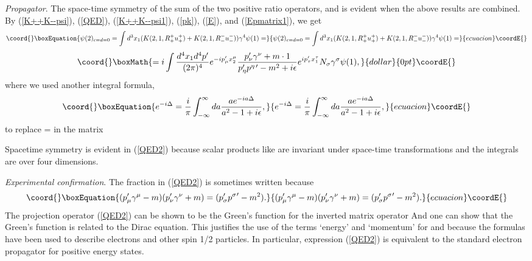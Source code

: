 \documentclass[a4paper,12pt]{article}
\begin{document}
	\coordHE{} {\textit{Propagator}}. The space-time symmetry of the sum of the two positive ratio operators, \coordHE{} and \coordHE{} is evident when the above results are combined. By (\ref{K++K--psi}), (\ref{QED}), (\ref{K++K--psi1}), (\ref{pk}), (\ref{E}), and (\ref{Epmatrix1}), we get
\begin{equation}\coord{}\boxEquation{	\label{QED2}
\psi(2)_{c=d=0} = \int d^3x_{1}(K(2,1,R_{+}^{+}u_{+}^{+}) + K(2,1,R_{-}^{-}u_{-}^{-})) \gamma^{4} \psi(1) =
}{	\psi(2)_{c=d=0} = \int d^3x_{1}(K(2,1,R_{+}^{+}u_{+}^{+}) + K(2,1,R_{-}^{-}u_{-}^{-})) \gamma^{4} \psi(1) =
}{ecuacion}\coordE{}\end{equation}
$$\coord{}\boxMath{ = i\int \frac{d^4 x_{1} d^4 p^{\prime} }{(2 \pi)^4} e^{-ip_{\mu}^{\prime}x_{2}^{\mu}}  \frac{ p_{\nu}^{\prime} \gamma^{\nu} + m \cdot 1}{p_{\eta}^{\prime}p^{\eta \, \prime}  - m^2 + i\epsilon} e^{ i p_{\tau}^{\prime} x_{1}^{\tau}} N_{\sigma} \gamma^{\sigma} \psi(1),}{dollar}{0pt}\coordE{}$$
where we used another integral formula,
\begin{equation}\coord{}\boxEquation{ \label{expiDelta2}	
e^{-i \Delta} =  \frac{i}{ \pi} \int_{-\infty}^{\infty} da \frac{ae^{-ia\Delta}}{a^2-1+i\epsilon},
}{ e^{-i \Delta} =  \frac{i}{ \pi} \int_{-\infty}^{\infty} da \frac{ae^{-ia\Delta}}{a^2-1+i\epsilon},
}{ecuacion}\coordE{}\end{equation}
 to replace \coordHE{}  \coordHE{} = \coordHE{} in the matrix \coordHE{} 

	Spacetime symmetry is evident in (\ref{QED2}) because scalar products like \coordHE{} are invariant under space-time transformations and the integrals are over four dimensions.

	{\textit{Experimental confirmation}}. The fraction in (\ref{QED2}) is sometimes written \coordHE{} because
\begin{equation}\coord{}\boxEquation{	\label{m-1}
(p_{\mu}^{\prime} \gamma^{\mu} - m)(p_{\nu}^{\prime} \gamma^{\nu} + m) = (p_{\sigma}^{\prime} {p^{\sigma}}^{\prime}- m^2) .
}{	(p_{\mu}^{\prime} \gamma^{\mu} - m)(p_{\nu}^{\prime} \gamma^{\nu} + m) = (p_{\sigma}^{\prime} {p^{\sigma}}^{\prime}- m^2) .
}{ecuacion}\coordE{}\end{equation}
The projection operator (\ref{QED2}) can be shown to be the Green's function for the inverted matrix operator \coordHE{} \cite{bjorken} And one can show that the Green's function is related to the Dirac equation. This justifies the use of the terms `energy' and `momentum' for \coordHE{} and \coordHE{} because the formulas have been used to describe electrons and other spin 1/2 particles. In particular, expression (\ref{QED2}) is equivalent to the standard electron propagator for positive energy states.
\end{document}
